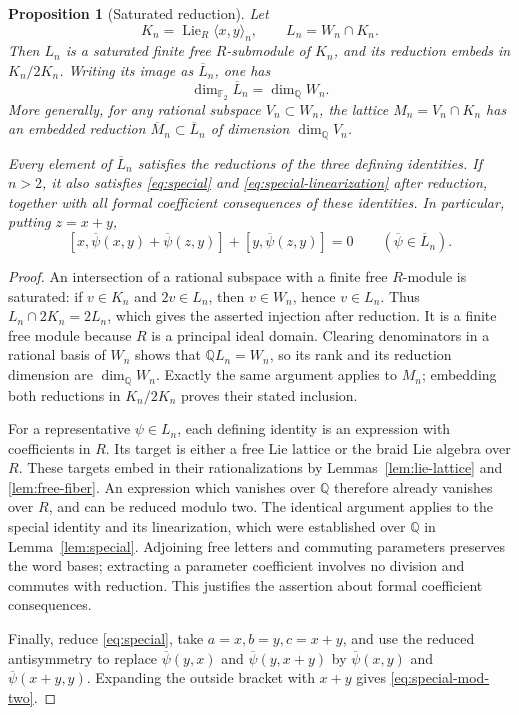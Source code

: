 \documentclass[11pt]{article}
\newtheorem{proposition}[theorem]{Proposition}
\theoremstyle{definition}
\theoremstyle{remark}
\numberwithin{equation}{section}
\begin{document}
\begin{proposition}[Saturated reduction]\label{prop:saturated-reduction}
Let
\[
 K_n=\operatorname{Lie}_R\langle x,y\rangle_n,
 \qquad L_n=W_n\cap K_n.
\]
Then \(L_n\) is a saturated finite free \(R\)-submodule of \(K_n\),
and its reduction embeds in \(K_n/2K_n\).  Writing its image as
\(\overline L_n\), one has
\begin{equation}\label{eq:saturated-dimension}
 \dim_{{\mathbb F_2}}\overline L_n=\dim_{\mathbb Q}W_n.
\end{equation}
More generally, for any rational subspace \(V_n\subset W_n\), the
lattice \(M_n=V_n\cap K_n\) has an embedded reduction
\(\overline M_n\subset\overline L_n\) of dimension
\(\dim_{\mathbb Q}V_n\).

Every element of \(\overline L_n\) satisfies the reductions of the
three defining identities.  If \(n>2\), it also satisfies
\eqref{eq:special} and \eqref{eq:special-linearization} after
reduction, together with all formal coefficient consequences of
these identities.  In particular, putting \(z=x+y\),
\begin{equation}\label{eq:special-mod-two}
 [x,\overline\psi(x,y)+\overline\psi(z,y)]
       +[y,\overline\psi(z,y)]=0
 \qquad(\overline\psi\in\overline L_n).
\end{equation}
\end{proposition}
\begin{proof}
An intersection of a rational subspace with a finite free
\(R\)-module is saturated: if \(v\in K_n\) and \(2v\in L_n\),
then \(v\in W_n\), hence \(v\in L_n\).  Thus
\(L_n\cap2K_n=2L_n\), which gives the asserted injection after
reduction.  It is a finite free module because \(R\) is a principal
ideal domain.  Clearing denominators in a rational basis of
\(W_n\) shows that \(\mathbb Q L_n=W_n\), so its rank and its reduction
dimension are \(\dim_{\mathbb Q}W_n\).  Exactly the same argument applies
to \(M_n\); embedding both reductions in \(K_n/2K_n\) proves their
stated inclusion.

For a representative \(\psi\in L_n\), each defining identity is
an expression with coefficients in \(R\).  Its target is either a
free Lie lattice or the braid Lie algebra over \(R\).  These targets
embed in their rationalizations by Lemmas~\ref{lem:lie-lattice} and
\ref{lem:free-fiber}.  An expression which vanishes over \(\mathbb Q\)
therefore already vanishes over \(R\), and can be reduced modulo
two.  The identical argument applies to the special identity and
its linearization, which were established over \(\mathbb Q\) in
Lemma~\ref{lem:special}.  Adjoining free letters and commuting
parameters preserves the word bases; extracting a parameter
coefficient involves no division and commutes with reduction.
This justifies the assertion about formal coefficient consequences.

Finally, reduce \eqref{eq:special}, take \(a=x,b=y,c=x+y\), and
use the reduced antisymmetry to replace \(\overline\psi(y,x)\)
and \(\overline\psi(y,x+y)\) by
\(\overline\psi(x,y)\) and \(\overline\psi(x+y,y)\).
Expanding the outside bracket with \(x+y\) gives
\eqref{eq:special-mod-two}.
\end{proof}
\end{document}
